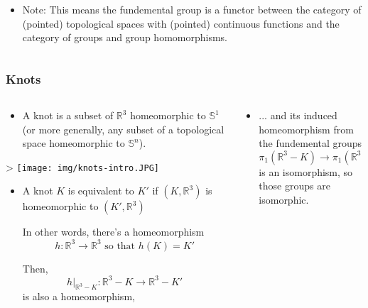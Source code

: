 \documentclass[8pt]{beamer}
\begin{document}
\begin{frame}
\begin{columns}
\begin{column}[T]{0.5\textwidth}
\begin{itemize}
          \item<11-> Note: This means the fundemental group is a functor between
            the category of (pointed) topological spaces with (pointed)
            continuous functions and the category of groups and group homomorphisms.
        \end{itemize}
      \end{column}
    \end{columns}
  \end{frame}




  \begin{frame}
    \frametitle{Knots}
    \begin{columns}
      \begin{column}[T]{0.5\textwidth}
        \begin{itemize}
          \item<1->
            A knot is a subset of $\mathbb{R}^3$ homeomorphic to $\mathbb{S}^1$
            (or more generally, any subset of a topological space homeomorphic
            to $\mathbb{S}^n$).
        \end{itemize}

        \begin{center}>
        \texttt{[image: img/knots-intro.JPG]}
        \end{center}

        \begin{itemize}
          \item<3->
            A knot $K$ is equivalent to $K'$ if
            $(K, \mathbb{R}^3)$ is homeomorphic to $(K', \mathbb{R}^3)$

            In other words, there's a homeomorphism
            \[h : \mathbb{R}^3 \rightarrow \mathbb{R}^3 \text{ so that }
            h(K) = K'\]

            Then,
            \[h|_{\mathbb{R}^3-K} : \mathbb{R}^3-K \rightarrow \mathbb{R}^3-K'\]
            is also a homeomorphism,
        \end{itemize}
      \end{column}


      \begin{column}[T]{0.5\textwidth}
        \begin{itemize}
          \item<4->
            ... and its induced homeomorphism from the fundemental groups
            \[\pi_1(\mathbb{R}^3-K) \rightarrow \pi_1(\mathbb{R}^3-K')\]
            is an isomorphism, so those groups are isomorphic.


\end{itemize}
\end{column}
\end{columns}
\end{frame}
\end{document}
